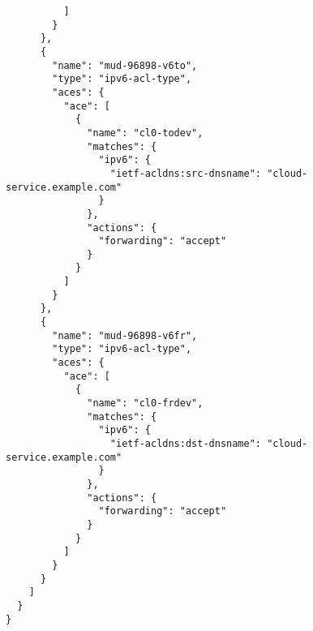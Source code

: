 \begin{verbatim}
          ]
        }
      },
      {
        "name": "mud-96898-v6to",
        "type": "ipv6-acl-type",
        "aces": {
          "ace": [
            {
              "name": "cl0-todev",
              "matches": {
                "ipv6": {
                  "ietf-acldns:src-dnsname": "cloud-service.example.com"
                }
              },
              "actions": {
                "forwarding": "accept"
              }
            }
          ]
        }
      },
      {
        "name": "mud-96898-v6fr",
        "type": "ipv6-acl-type",
        "aces": {
          "ace": [
            {
              "name": "cl0-frdev",
              "matches": {
                "ipv6": {
                  "ietf-acldns:dst-dnsname": "cloud-service.example.com"
                }
              },
              "actions": {
                "forwarding": "accept"
              }
            }
          ]
        }
      }
    ]
  }
}
\end{verbatim}
\label{code:mud}
